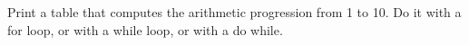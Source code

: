  
 Print a table that computes the arithmetic progression from 1 to 10.
 Do it with a for loop, or with a while loop, or with a do while.

